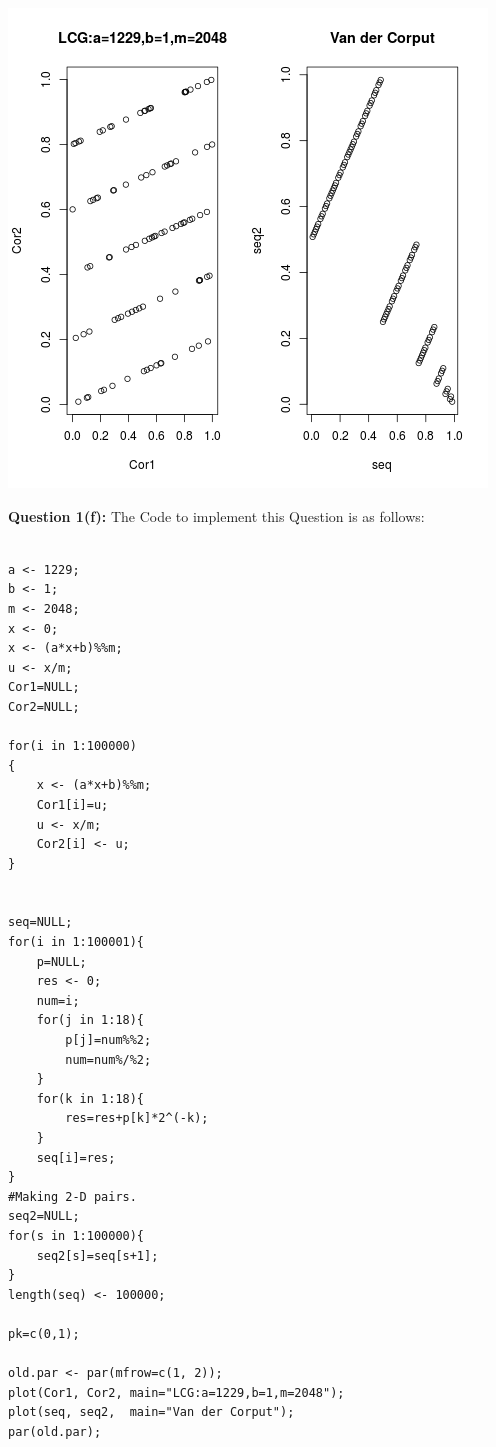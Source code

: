 \documentclass{article}
\begin{document}
\begin{center}
	\includegraphics{Question1_5.png}
\end{center}

\newpage
\textbf{\large Question 1(f):}
The Code to implement this Question is as follows:\\


\lstset {language=R}


\begin{lstlisting}

a <- 1229;
b <- 1;
m <- 2048;
x <- 0;
x <- (a*x+b)%%m;
u <- x/m;
Cor1=NULL;
Cor2=NULL;

for(i in 1:100000)
{
	x <- (a*x+b)%%m;
	Cor1[i]=u;
	u <- x/m;
	Cor2[i] <- u;
}


seq=NULL;
for(i in 1:100001){
	p=NULL;
	res <- 0;
	num=i;
	for(j in 1:18){
		p[j]=num%%2;
		num=num%/%2;
	}
	for(k in 1:18){
		res=res+p[k]*2^(-k);
	}
	seq[i]=res;
}
#Making 2-D pairs.
seq2=NULL;
for(s in 1:100000){
	seq2[s]=seq[s+1];
}
length(seq) <- 100000;

pk=c(0,1);

old.par <- par(mfrow=c(1, 2));
plot(Cor1, Cor2, main="LCG:a=1229,b=1,m=2048");
plot(seq, seq2,  main="Van der Corput");
par(old.par);


\end{lstlisting}
\end{document}

